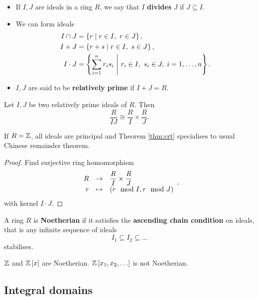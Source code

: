 \begin{definition}
\hfill
\begin{itemize}
\item If $ I, J $ are ideals in a ring $ R $, we say that $ I $ \textbf{divides} $ J $ if $ J \subseteq I $.
\item We can form ideals
\begin{align*}
I \cap J & = \left\{ r \mid r \in I, \ r \in J \right\}, \\
I + J & = \left\{ r + s \mid r \in I, \ s \in J \right\}, \\
I \cdot J & = \left\{ \sum_{i = 1}^n r_is_i \ \Bigg| \ r_i \in I, \ s_i \in J, \ i = 1, \dots, n \right\}.
\end{align*}
\item $ I, J $ are said to be \textbf{relatively prime} if $ I + J = R $.
\end{itemize}
\end{definition}

\begin{theorem}
\label{thm:crt}
Let $ I, J $ be two relatively prime ideals of $ R $. Then
$$ \dfrac{R}{IJ} \cong \dfrac{R}{I} \times \dfrac{R}{J}. $$
\end{theorem}

\begin{remark*}
If $ R = \mathbb{Z} $, all ideals are principal and Theorem \ref{thm:crt} specialises to usual Chinese remainder theorem.
\end{remark*}

\begin{proof}
Find surjective ring homomorphism
$$ \function{R}{\dfrac{R}{I} \times \dfrac{R}{J}}{r}{\rb{r \mod I, r \mod J}}, $$
with kernel $ I \cdot J $.
\end{proof}

\begin{definition}
A ring $ R $ is \textbf{Noetherian} if it satisfies the \textbf{ascending chain condition} on ideals, that is any infinite sequence of ideals
$$ I_1 \subseteq I_2 \subseteq \dots $$
stabilises.
\end{definition}

\begin{example*}
$ \mathbb{Z} $ and $ \mathbb{Z}\left[ x \right] $ are Noetherian. $ \Z\sb{x_1, x_2, \dots} $ is not Noetherian.
\end{example*}

\pagebreak

\subsection{Integral domains}

